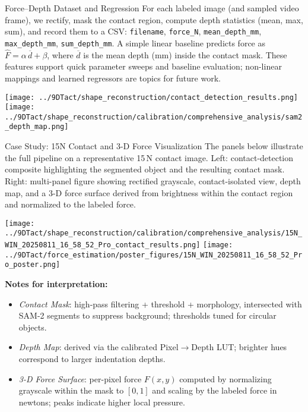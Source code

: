 \documentclass[final]{beamer}
\newlength{\colwidth}
\begin{document}
\begin{frame}[t]
\begin{columns}[t]
\begin{column}{\colwidth}
  \begin{block}{Force--Depth Dataset and Regression}
  For each labeled image (and sampled video frame), we rectify, mask the contact region, compute depth statistics (mean, max, sum), and record them to a CSV: \texttt{filename}, \texttt{force\_N}, \texttt{mean\_depth\_mm}, \texttt{max\_depth\_mm}, \texttt{sum\_depth\_mm}. A simple linear baseline predicts force as \(\hat F = \alpha\,\overline{d} + \beta\), where \(\overline{d}\) is the mean depth (mm) inside the contact mask. These features support quick parameter sweeps and baseline evaluation; non-linear mappings and learned regressors are topics for future work.
  \begin{center}
    \texttt{[image: ../9DTact/shape\_reconstruction/contact\_detection\_results.png]}\hfill
    \texttt{[image: ../9DTact/shape\_reconstruction/calibration/comprehensive\_analysis/sam2\_depth\_map.png]}
  \end{center}
  \end{block}

  \begin{block}{Case Study: 15N Contact and 3-D Force Visualization}
  The panels below illustrate the full pipeline on a representative 15\,N contact image. Left: contact-detection composite highlighting the segmented object and the resulting contact mask. Right: multi-panel figure showing rectified grayscale, contact-isolated view, depth map, and a 3-D force surface derived from brightness within the contact region and normalized to the labeled force.
  \begin{center}
    \texttt{[image: ../9DTact/shape\_reconstruction/calibration/comprehensive\_analysis/15N\_WIN\_20250811\_16\_58\_52\_Pro\_contact\_results.png]}\hfill
    \texttt{[image: ../9DTact/force\_estimation/poster\_figures/15N\_WIN\_20250811\_16\_58\_52\_Pro\_poster.png]}
  \end{center}
  \vspace{0.5em}
  \textbf{Notes for interpretation:}
  \begin{itemize}
    \item \textit{Contact Mask}: high-pass filtering + threshold + morphology, intersected with SAM-2 segments to suppress background; thresholds tuned for circular objects.
    \item \textit{Depth Map}: derived via the calibrated Pixel$\rightarrow$Depth LUT; brighter hues correspond to larger indentation depths.
    \item \textit{3-D Force Surface}: per-pixel force $F(x,y)$ computed by normalizing grayscale within the mask to $[0,1]$ and scaling by the labeled force in newtons; peaks indicate higher local pressure.
  \end{itemize}
  \end{block}


\end{column}
\end{columns}
\end{frame}
\end{document}
